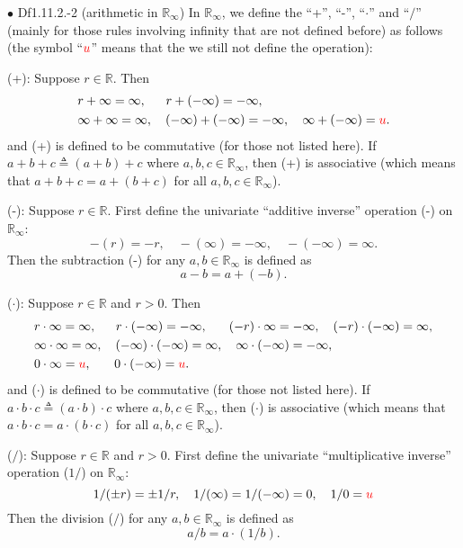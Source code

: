 \documentclass{article}
\begin{document}
\begin{Df}{$\bullet$ Df1.11.2.-2 (arithmetic in $\mathbb{R}_\infty$)}
    In $\mathbb{R}_\infty$, we define the ``+'', ``-'', ``$\cdot$'' and ``$/$'' (mainly for those rules involving infinity that are not defined before) as follows (the symbol ``$\textcolor{red}{u}$'' means that the we still not define the operation):
    \begin{compactenum}
        \item (+): Suppose $r\in\mathbb{R}$. Then
        $$
        \begin{aligned}
            &r+\infty = \infty, \;\;\quad r+(-\infty) = -\infty,  \\
            &\infty+\infty = \infty, \quad (-\infty)+(-\infty) = -\infty, \quad \infty+(-\infty) = \textcolor{red}{u}.
        \end{aligned}
        $$
        and (+) is defined to be commutative (for those not listed here). \textcolor{Th}{If $a+b+c\triangleq (a+b)+c$ where $a,b,c\in\mathbb{R}_\infty$, then (+) is associative (which means that $a+b+c = a+(b+c)$ for all $a,b,c\in\mathbb{R}_\infty$).}
        \item (-): Suppose $r\in\mathbb{R}$. First define the univariate ``additive inverse'' operation (-) on $\mathbb{R}_\infty$:
        $$ -(r) = -r, \quad -(\infty) = -\infty, \quad -(-\infty) = \infty. $$
        Then the subtraction (-) for any $a,b\in\mathbb{R}_\infty$ is defined as
        $$ a-b = a+(-b). $$
        \item ($\cdot$): Suppose $r\in\mathbb{R}$ and $r>0$. Then
        $$
        \begin{aligned}
            &r\cdot\infty = \infty, \;\;\quad r\cdot(-\infty) = -\infty, \;\;\,\quad (-r)\cdot\infty = -\infty, \quad (-r)\cdot(-\infty) = \infty, \\
            &\infty\cdot\infty = \infty, \quad (-\infty)\cdot(-\infty) = \infty, \quad \infty\cdot(-\infty) = -\infty, \\
            &0\cdot\infty = \textcolor{red}{u}, \;\;\;\quad 0\cdot(-\infty) = \textcolor{red}{u}.
        \end{aligned}
        $$
        and ($\cdot$) is defined to be commutative (for those not listed here). \textcolor{Th}{If $a\cdot b\cdot c\triangleq (a\cdot b)\cdot c$ where $a,b,c\in\mathbb{R}_\infty$, then ($\cdot$) is associative (which means that $a\cdot b\cdot c = a\cdot(b\cdot c)$ for all $a,b,c\in\mathbb{R}_\infty$).}
        \item ($/$): Suppose $r\in\mathbb{R}$ and $r>0$. First define the univariate ``multiplicative inverse'' operation ($1/$) on $\mathbb{R}_\infty$:
        $$ 1/(\pm r) = \pm 1/r, \quad 1/(\infty) = 1/(-\infty) = 0, \quad 1/0 = \textcolor{red}{u} $$
        Then the division ($/$) for any $a,b\in\mathbb{R}_\infty$ is defined as
        $$ a/b = a\cdot(1/b). $$
    \end{compactenum}
\end{Df}
\end{document}
